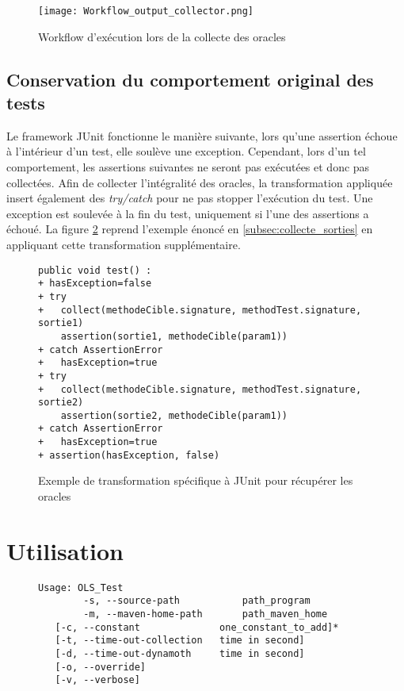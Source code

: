 \begin{figure}[H]
\begin{center}
\texttt{[image: Workflow\_output\_collector.png]}
\end{center}
\caption{Workflow d'exécution lors de la collecte des oracles}
\label{fig:workflow_collectes_sorties}
\end{figure}

\subsection{Conservation du comportement original des tests}

\par Le framework JUnit fonctionne le manière suivante, lors qu'une assertion échoue à l'intérieur d'un test, elle soulève une exception. Cependant, lors d'un tel comportement, les assertions suivantes ne seront pas exécutées et donc pas collectées. Afin de collecter l'intégralité des oracles, la transformation appliquée insert également des \textit{try/catch} pour ne pas stopper l'exécution du test. Une exception est soulevée à la fin du test, uniquement si l'une des assertions a échoué. La figure \ref{fig:collect_sorties_try_catch} reprend l'exemple énoncé en \ref{subsec:collecte_sorties} en appliquant cette transformation supplémentaire.

\begin{figure}[H]
\begin{lstlisting}
public void test() :
+ hasException=false
+ try
+   collect(methodeCible.signature, methodTest.signature, sortie1)
    assertion(sortie1, methodeCible(param1))
+ catch AssertionError
+   hasException=true
+ try
+   collect(methodeCible.signature, methodTest.signature, sortie2)
    assertion(sortie2, methodeCible(param1))
+ catch AssertionError
+   hasException=true
+ assertion(hasException, false)
\end{lstlisting}
\caption{Exemple de transformation spécifique à JUnit pour récupérer les oracles}
\label{fig:collect_sorties_try_catch}
\end{figure}






\section{Utilisation}

\begin{figure}[H]

\begin{verbatim}
Usage: OLS_Test
	    -s, --source-path           path_program
	    -m, --maven-home-path       path_maven_home
   [-c, --constant              one_constant_to_add]*
   [-t, --time-out-collection   time in second]
   [-d, --time-out-dynamoth     time in second]
   [-o, --override]
   [-v, --verbose]
\end{verbatim}

\end{figure}
	

	
		
		
		